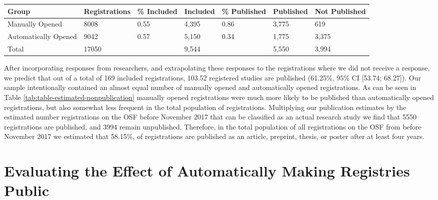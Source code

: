 \documentclass[
  ,jou, a4paper,floatsintext]{apa6}
\begin{document}
\begin{table*}[tbp]

\begin{center}
\begin{threeparttable}

\caption{\label{tab:table-estimated-nonpublication}Estimated number of published and unpublished studies registered on the OSF before November 2017.}

\begin{tabular}{lllllll}
\toprule
Group & \multicolumn{1}{c}{Registrations} & \multicolumn{1}{c}{\% Included} & \multicolumn{1}{c}{Included} & \multicolumn{1}{c}{\% Published} & \multicolumn{1}{c}{Published} & \multicolumn{1}{c}{Not Published}\\
\midrule
Manually Opened & 8008 & 0.55 & 4,395 & 0.86 & 3,775 & 619\\
Automatically Opened & 9042 & 0.57 & 5,150 & 0.34 & 1,775 & 3,375\\
Total & 17050 &  & 9,544 &  & 5,550 & 3,994\\
\bottomrule
\end{tabular}

\end{threeparttable}
\end{center}

\end{table*}

After incorporating responses from researchers, and extrapolating these responses to the registrations where we did not receive a response, we predict that out of a total of 169 included registrations, 103.52 registered studies are published (61.25\%, 95\% CI {[}53.74; 68.27{]}). Our sample intentionally contained an almost equal number of manually opened and automatically opened registrations. As can be seen in Table \ref{tab:table-estimated-nonpublication} manually opened registrations were much more likely to be published than automatically opened registrations, but also somewhat less frequent in the total population of registrations. Multiplying our publication estimates by the estimated number registrations on the OSF before November 2017 that can be classified as an actual research study we find that 5550 registrations are published, and 3994 remain unpublished. Therefore, in the total population of all registrations on the OSF from before November 2017 we estimated that 58.15\%, of registrations are published as an article, preprint, thesis, or poster after at least four years.

\hypertarget{evaluating-the-effect-of-automatically-making-registries-public}{%
\section{Evaluating the Effect of Automatically Making Registries Public}\label{evaluating-the-effect-of-automatically-making-registries-public}}
\end{document}
